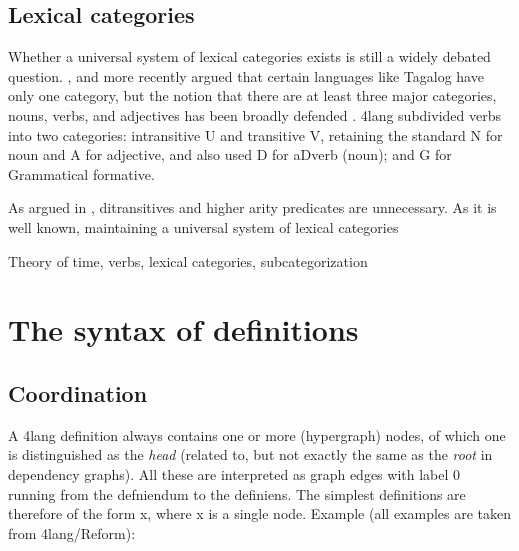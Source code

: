 \documentclass[11pt,bookmarks,bookmarksnumbered,naturalnames,plainpages=false,pdftex,colorlinks=true,urlcolor=blue,bookmarksdepth=subsection,plainpages=false]{paper}
\begin{document}
\subsection{Lexical categories}\label{lexcat}

Whether a universal system of lexical categories exists is still a widely
debated question. \cite{Bloomfield:1933}, and more recently
\cite{Kaufman:2009} argued that certain languages like Tagalog have only one
category, but the notion that there are at least three major categories,
nouns, verbs, and adjectives has been broadly defended
\citep{Baker:2003,Chung:2012}. 4lang subdivided verbs into two categories:
intransitive U and transitive V, retaining the standard N for noun and A for
adjective, and also used D for aDverb (noun); and G for Grammatical formative.






As argued in \citep{Kornai:2012}, ditransitives
and higher arity predicates are unnecessary. As it is well known, maintaining
a universal system of lexical categories 












Theory of time, verbs, lexical categories, subcategorization






















\section{The syntax of definitions}\label{8thcol}

\subsection{Coordination}\label{comma}

A 4lang definition always contains one or more (hypergraph) nodes, of which
one is distinguished as the {\it head} (related to, but not exactly the same
as the {\it root} in dependency graphs). All these are interpreted as graph
edges with label 0 running from the defniendum to the definiens.  The simplest
definitions are therefore of the form x, where x is a single node. Example
(all examples are taken from 4lang/Reform):
\end{document}
